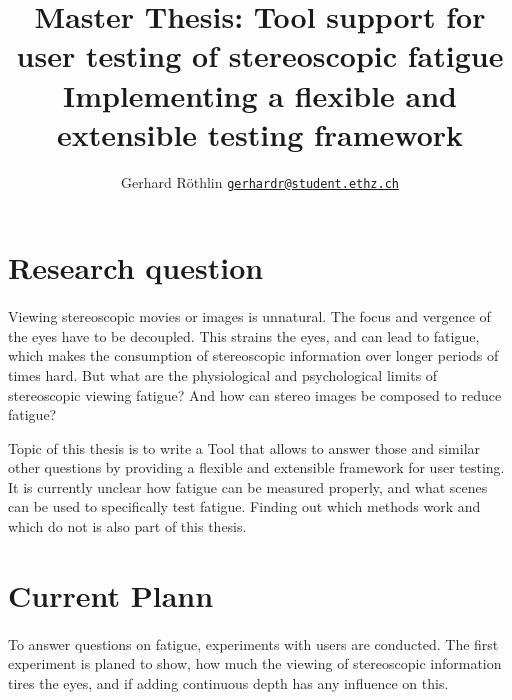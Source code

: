 \documentclass[11pt]{scrartcl}
\title{Master Thesis: Tool support for user testing of stereoscopic fatigue\\
{\large Implementing a flexible and extensible testing framework}}
\author{\normalsize Gerhard R\"othlin 
{\tt  \href{mailto:gerhardr@student.ethz.ch}{gerhardr@student.ethz.ch}}}
\date{}
\begin{document}
\maketitle



\begin{multicols}{2}


\section{Research question}
\paragraph{}
Viewing stereoscopic movies or images is unnatural. The focus and vergence of the eyes have to be decoupled. This strains the eyes, and can lead to fatigue, which makes the consumption of stereoscopic information over longer periods of times hard. But what are the physiological and psychological limits of stereoscopic viewing fatigue? And how can stereo images be composed to reduce fatigue?

Topic of this thesis is to write a Tool that allows to answer those and similar other questions by providing a flexible and extensible framework for user testing. It is currently unclear how fatigue can be measured properly, and what scenes can be used to specifically test fatigue. Finding out which methods work and which do not is also part of this thesis.

\section{Current Plann}
\paragraph{}
To answer questions on fatigue, experiments with users are conducted. The first experiment is planed to show, how much the viewing of stereoscopic information tires the eyes, and if adding continuous depth has any influence on this.


\end{multicols}
\end{document}
